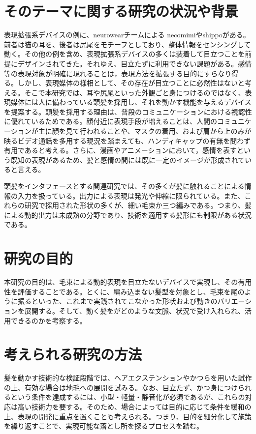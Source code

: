 \documentclass[a4paper]{jsarticle}
\begin{document}
\section{そのテーマに関する研究の状況や背景}
表現拡張系デバイスの例に、neurowearチームによる necomimiやshippoがある。前者は猫の耳を、後者は尻尾をモチーフとしており、整体情報をセンシングして動く。その他の例を含め、表現拡張系デバイスの多くは装着して目立つことを前提にデザインされてきた。それゆえ、目立たずに利用できない課題がある。感情等の表現対象が明確に現れることは，表現方法を拡張する目的にすらなり得る。しかし、表現媒体の様相として、その存在が目立つことに必然性はないと考える。そこで本研究では、耳や尻尾といった外観ごと身につけるのではなく、表現媒体には人に備わっている頭髪を採用し、それを動かす機能を与えるデバイスを提案する。頭髪を採用する理由は、普段のコミュニケーションにおける視認性に優れているためである。顔付近に表現手段が増えることは、人間のコミュニケーションが主に顔を見て行われることや、マスクの着用、および肩から上のみが映るビデオ通話を多用する現況を踏まえても、ハンディキャップの有無を問わず有用であると考える。さらに、漫画やアニメーションにおいて，感情を表すという既知の表現があるため、髪と感情の間には既に一定のイメージが形成されていると言える。

頭髪をインタフェースとする関連研究では、その多くが髪に触れることによる情報の入力を扱っている。出力による表現は発光や伸縮に限られている。また、これらの研究で採用された形状の多くが、細い毛束か三つ編みである。つまり、髪による動的出力は未成熟の分野であり、技術を適用する髪形にも制限がある状況である。

\section{研究の目的} 
本研究の目的は、毛束による動的表現を目立たないデバイスで実現し、その有用性を評価することである。とくに、編み込まない髪型を対象とし、毛束を尾のように振るといった、これまで実践されてこなかった形状および動きのバリエーションを展開する。そして、動く髪をがどのような文脈、状況で受け入れられ、活用できるのかを考察する。

\section{考えられる研究の方法} 
髪を動かす技術的な検証段階では、ヘアエクステンションやかつらを用いた試作の上、有効な場合は地毛への展開を試みる。なお、目立たず、かつ身につけられるという条件を達成するには、小型・軽量・静音化が必須であるが、これらの対応は高い技術力を要する。そのため、場合によっては目的に応じて条件を緩和の上、表現の開発に重点を置くことも考えられる。つまり、目的を細分化して施策を繰り返すことで、実現可能な落とし所を探るプロセスを踏む。
\end{document}

